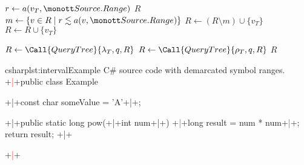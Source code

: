 \documentclass[../thesis]{subfiles}
\begin{document}
\begin{algorithm}
	\small

	\caption{Efficiently associating \gls{lsp}-returned \glspl{range} to existing elements using an already constructed augmented \gls{intervaltree}.}\label{alg:interval}
	\begin{algorithmic}[1]
		\State \Return {}
		\EndFunction

		\Statex
		\State $r \gets a(v_T, \tt{Source.Range})$
		\State \Return $R$
		\EndIf
		\State $m \gets \{v \in R \mid r \lesssim a(v, \tt{Source.Range}) \}$
		 
		\State $R \gets (R \setminus m) \cup \{v_T\}$
		 
		\State $R \gets R \cup \{v_T\}$
		\EndIf
		\EndIf

		\State $R \gets \Call{QueryTree}{\lambda_T, q, R}$
		 
		\State $R \gets \Call{QueryTree}{\rho_T, q, R}$
		\EndIf
		\State \Return $R$
		\EndFunction
	\end{algorithmic}
\end{algorithm}

\begin{codebox}[minted options={linenos,escapeinside=++,firstnumber=0}]{csharp}{lst:interval}{Example C\# source code with demarcated symbol ranges.}
+\textcolor{red}{|}+public class Example {
  +\textcolor{Emerald}{|}+const char someValue = 'A'+\textcolor{Emerald}{|}+;

  +\textcolor{Peach}{|}+public static long pow(+\textcolor{OliveGreen}{|}+int num+\textcolor{OliveGreen}{|}+) {
    +\textcolor{Brown}{|}+long result = num * num+\textcolor{Brown}{|}+;
    return result;
  }+\textcolor{Peach}{|}+
}+\textcolor{red}{|}+
\end{codebox}
\end{document}
